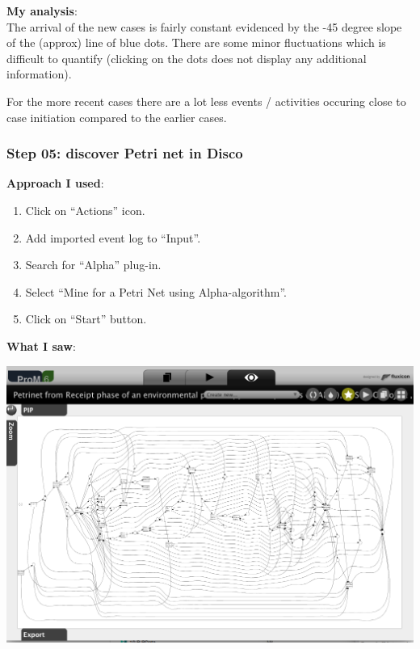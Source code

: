 \documentclass[]{article}
\begin{document}
\textbf{My analysis}:\\The arrival of the new cases is fairly constant
evidenced by the -45 degree slope of the (approx) line of blue dots.
There are some minor fluctuations which is difficult to quantify
(clicking on the dots does not display any additional information).

For the more recent cases there are a lot less events / activities
occuring close to case initiation compared to the earlier cases.

\subsubsection{Step 05: discover Petri net in
Disco}\label{step-05-discover-petri-net-in-disco}

\textbf{Approach I used}:

\begin{enumerate}
\def\labelenumi{\arabic{enumi}.}
\itemsep1pt\parskip0pt
\item
  Click on ``Actions'' icon.\\
\item
  Add imported event log to ``Input''.\\
\item
  Search for ``Alpha'' plug-in.\\
\item
  Select ``Mine for a Petri Net using Alpha-algorithm''.
\item
  Click on ``Start'' button.
\end{enumerate}

\textbf{What I saw}:

\includegraphics{CoSeLoG_Step_05.png}
\end{document}
